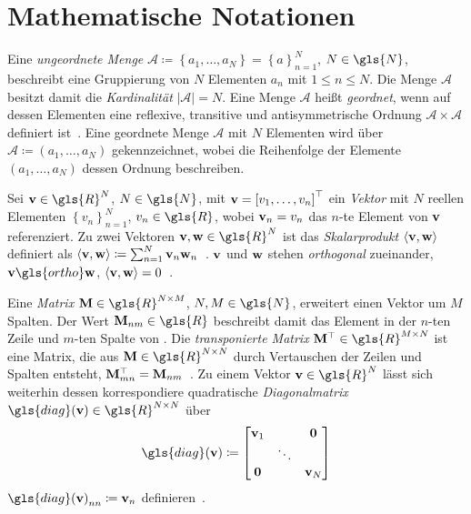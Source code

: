 \section{Mathematische Notationen}
\label{mathematische_notationen}

Eine \emph{ungeordnete Menge} $\mathcal{A} \coloneqq \left\{a_1, \ldots, a_N\right\} = {\left\{a\right\}}_{n=1}^N$, $N \in \gls{N}$, beschreibt eine Gruppierung von $N$ Elementen $a_n$ mit $1 \leq n \leq N$.
Die Menge $\mathcal{A}$ besitzt damit die \emph{Kardinalität} $\left|\mathcal{A}\right| = N$.
Eine Menge $\mathcal{A}$ heißt \emph{geordnet}, wenn auf dessen Elementen eine reflexive, transitive und antisymmetrische Ordnung $\mathcal{A} \times \mathcal{A}$ definiert ist~\cite{linear}.
Eine geordnete Menge $\mathcal{A}$ mit $N$ Elementen wird über $\mathcal{A} \coloneqq \left(a_1, \ldots, a_N\right)$ gekennzeichnet, wobei die Reihenfolge der Elemente $\left(a_1, \ldots, a_N\right)$ dessen Ordnung beschreiben.

Sei $\ve{v} \in \gls{R}^N$, $N \in \gls{N}$, mit $\ve{v} = {\left[v_1, \ldots, v_n \right]}^{\top}$ ein \emph{Vektor} mit $N$ reellen Elementen ${\left\{v_n\right\}}_{n=1}^N$, $v_n \in \gls{R}$, wobei $\mathbf{v}_n = v_n$ das $n$-te Element von $\mathbf{v}$ referenziert.
Zu zwei Vektoren $\ve{v}, \ve{w} \in \gls{R}^N$ ist das \emph{Skalarprodukt} $\left\langle \ve{v}, \ve{w} \right\rangle$ definiert als $\left\langle \ve{v}, \ve{w}\right\rangle \coloneqq \sum_{n=1}^N \ve{v}_n \ve{w}_n$~\cite{linear}.
$\mathbf{v}$ und $\mathbf{w}$ stehen \emph{orthogonal} zueinander, \dhe{} $\ve{v} \gls{ortho} \ve{w}$, \gdw{} $\left\langle \ve{v}, \ve{w} \right\rangle = 0$~\cite{linear}.

Eine \emph{Matrix} $\ma{M} \in \gls{R}^{N \times M}$, $N, M \in \gls{N}$, erweitert einen Vektor um $M$ Spalten.
Der Wert $\ma{M}_{nm} \in \gls{R}$ beschreibt damit das Element in der $n$-ten Zeile und $m$-ten Spalte von .
Die \emph{transponierte Matrix} $\ma{M}^{\top} \in \gls{R}^{M \times N}$ ist eine Matrix, die aus $\ma{M} \in \gls{R}^{N \times N}$ durch Vertauschen der Zeilen und Spalten entsteht, \dhe{} $\mathbf{M}^{\top}_{mn} = \mathbf{M}_{nm}$~\cite{linear}.
Zu einem Vektor $\ve{v} \in \gls{R}^{N}$ lässt sich weiterhin dessen korrespondiere quadratische \emph{Diagonalmatrix} $\gls{diag}\left(\ve{v}\right) \in \gls{R}^{N \times N}$
über
\begin{equation*}
  \gls{diag}\left(\ve{v}\right) \coloneqq \begin{bmatrix}
  \ve{v}_1 & & \ve{0}\\
  & \ddots & \\
  \ve{0} & & \ve{v}_N
  \end{bmatrix}
\end{equation*}
\bzw{} ${\gls{diag}\left(\ve{v}\right)}_{nn} \coloneqq \ve{v}_n$ definieren~\cite{Defferrard}.

